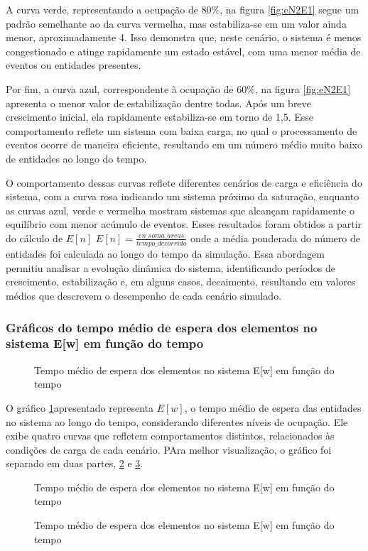A curva verde, representando a ocupação de 80\%, na figura \ref{fig:eN2E1} segue um padrão semelhante ao da curva vermelha, mas estabiliza-se em um valor ainda menor, aproximadamente 4. Isso demonstra que, neste cenário, o sistema é menos congestionado e atinge rapidamente um estado estável, com uma menor média de eventos ou entidades presentes.

Por fim, a curva azul, correspondente à ocupação de 60\%, na figura \ref{fig:eN2E1} apresenta o menor valor de estabilização dentre todas. Após um breve crescimento inicial, ela rapidamente estabiliza-se em torno de 1,5. Esse comportamento reflete um sistema com baixa carga, no qual o processamento de eventos ocorre de maneira eficiente, resultando em um número médio muito baixo de entidades ao longo do tempo.

O comportamento dessas curvas reflete diferentes cenários de carga e eficiência do sistema, com a curva rosa indicando um sistema próximo da saturação, enquanto as curvas azul, verde e vermelha mostram sistemas que alcançam rapidamente o equilíbrio com menor acúmulo de eventos. Esses resultados foram obtidos a partir do cálculo de $E[n]$
$E[n]= \frac{en\_soma\_areas}{tempo\_decorrido}$
onde a média ponderada do número de entidades foi calculada ao longo do tempo da simulação. Essa abordagem permitiu analisar a evolução dinâmica do sistema, identificando períodos de crescimento, estabilização e, em alguns casos, decaimento, resultando em valores médios que descrevem o desempenho de cada cenário simulado.
\subsubsection{Gráficos do tempo médio de espera dos elementos no sistema E[w] em função do tempo}
\begin{figure}[h!]
   \centering
   
   \caption{Tempo médio de espera dos elementos no sistema E[w] em função do tempo}
   \label{fig:eWE1}
\end{figure}

O gráfico \ref{fig:eWE1}{}apresentado representa $E[w]$, o tempo médio de espera das entidades no sistema ao longo do tempo, considerando diferentes níveis de ocupação. Ele exibe quatro curvas que refletem comportamentos distintos, relacionados às condições de carga de cada cenário. PAra melhor visualização, o gráfico foi separado em duas partes, \ref{fig:eW2E1} e \ref{fig:eW3E1}.
\begin{figure}[h!]
   \centering
   
   \caption{Tempo médio de espera dos elementos no sistema E[w] em função do tempo}
   \label{fig:eW2E1}
\end{figure}
\begin{figure}[h!]
   \centering
   
   \caption{Tempo médio de espera dos elementos no sistema E[w] em função do tempo}
   \label{fig:eW3E1}
\end{figure}

